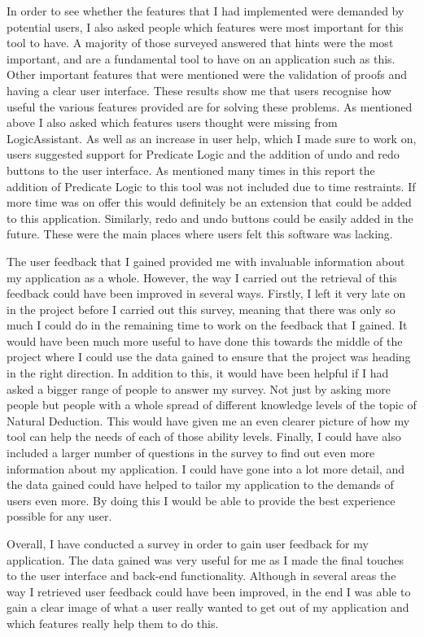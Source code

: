 In order to see whether the features that I had implemented were demanded by potential users, I also asked people which features were most important for this tool to have. A majority of those surveyed answered that hints were the most important, and are a fundamental tool to have on an application such as this. Other important features that were mentioned were the validation of proofs and having a clear user interface. These results show me that users recognise how useful the various features provided are for solving these problems. As mentioned above I also asked which features users thought were missing from LogicAssistant. As well as an increase in user help, which I made sure to work on, users suggested support for Predicate Logic and the addition of undo and redo buttons to the user interface. As mentioned many times in this report the addition of Predicate Logic to this tool was not included due to time restraints. If more time was on offer this would definitely be an extension that could be added to this application. Similarly, redo and undo buttons could be easily added in the future. These were the main places where users felt this software was lacking.

The user feedback that I gained provided me with invaluable information about my application as a whole. However, the way I carried out the retrieval of this feedback could have been improved in several ways. Firstly, I left it very late on in the project before I carried out this survey, meaning that there was only so much I could do in the remaining time to work on the feedback that I gained. It would have been much more useful to have done this towards the middle of the project where I could use the data gained to ensure that the project was heading in the right direction. In addition to this, it would have been helpful if I had asked a bigger range of people to answer my survey. Not just by asking more people but people with a whole spread of different knowledge levels of the topic of Natural Deduction. This would have given me an even clearer picture of how my tool can help the needs of each of those ability levels. Finally, I could have also included a larger number of questions in the survey to find out even more information about my application. I could have gone into a lot more detail, and the data gained could have helped to tailor my application to the demands of users even more. By doing this I would be able to provide the best experience possible for any user.

Overall, I have conducted a survey in order to gain user feedback for my application. The data gained was very useful for me as I made the final touches to the user interface and back-end functionality. Although in several areas the way I retrieved user feedback could have been improved, in the end I was able to gain a clear image of what a user really wanted to get out of my application and which features really help them to do this. 


